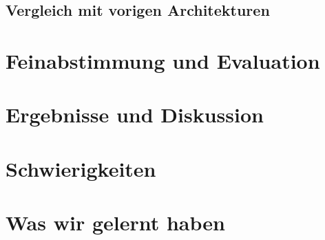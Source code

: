 \documentclass[a4paper]{article}
\newcommand{\action}[1]{\texttt{#1}}
\begin{document}

\subsection{Vergleich mit vorigen Architekturen}




\section{Feinabstimmung und Evaluation}
\label{sec:tuning_evaluation}

\section{Ergebnisse und Diskussion}
\label{sec:results}

\section{Schwierigkeiten}
\label{sec:difficulties}

\section{Was wir gelernt haben}
\label{sec:takeaway}
\end{document}
